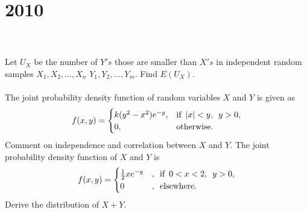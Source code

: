 \section*{2010}
\vspace{-.5cm}
\hrulefill \\\\
 Let $U_X$ be the number of $Y's$ those are smaller than $X's$ in independent random samples $X_1,X_2,\dotsc,X_n$ $Y_1,Y_2,\dotsc,Y_m$. Find $E(U_X)$.
\\\\
 The joint probability density function of random variables $X$ and $Y$ is given as
\begin{equation*}
    f(x,y) = \begin{cases}
    k(y^2 -x^2)e^{-y}, &\text{if} \enskip |x| < y,\enskip y > 0,\\
    0,& \text{otherwise}.
    \end{cases}
\end{equation*}
Comment on independence and correlation between $X$ and $Y$.\myline
{} The joint probability density function of $X$ and $Y$ is
\begin{equation*}
    f(x,y)= \begin{cases}
    \frac{1}{2}xe^{-y}&,\enskip \text{if}\enskip 0<x<2,\enskip y>0,\\
    0 &,\enskip \text{elsewhere.}
    \end{cases}
\end{equation*}
Derive the distribution of $X+Y$.




